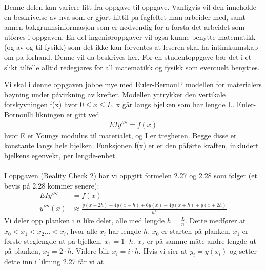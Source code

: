 Denne delen kan variere litt fra oppgave til oppgave. Vanligvis vil den inneholde en beskrivelse av hva som er gjort hittil pa fagfeltet man arbeider med, samt annen bakgrunnsinformasjon som er nødvendig for a forsta det arbeidet som utføres i oppgaven. En del ingeniøroppgaver vil ogsa kunne benytte matematikk (og av og til fysikk) som det ikke kan forventes at leseren skal ha intimkunnskap om pa forhand. Denne vil da beskrives her. For en studentoppgave bør det i et slikt tilfelle alltid redegjøres for all matematikk og fysikk som eventuelt benyttes.


Vi skal i denne oppgaven jobbe mye med Euler-Bernoulli modellen for materialers bøyning under påvirkning av krefter. Modellen yttrykker den vertikale forskyvningen f(x) hvor $0\leq x \leq L$. x går langs bjelken som har lengde L. Euler-Bornoulli likningen er gitt ved 
\begin{align}
    EIy''''=f(x)
\end{align}
hvor E er Youngs modulus til materialet, og I er tregheten. Begge disse er konstante langs hele bjelken. Funksjonen f(x) er er den påførte kraften, inkludert bjelkens egenvekt, per lengde-enhet. 
\\ \\
I oppgaven (Reality Check 2) har vi oppgitt formelen 2.27 og 2.28 som følger (et bevis på 2.28 kommer senere): 
\begin{align}
    EIy''''&=f(x) \nonumber \\
    y''''(x)& \approx \frac{y(x-2h)-4y(x-h)+6y(x)-4y(x+h)+y(x+2h)}{h^4}
\end{align}
Vi deler opp planken i $n$ like deler, alle med lengde $h=\frac{L}{n}$. Dette medfører at $x_0<x_1<x_2...<x_i$, hvor alle $x_i$ har lengde $h$. $x_0$ er starten på planken, $x_1$ er første steglengde ut på bjelken, $x_1=1\cdot h$. $x_2$ er på samme måte andre lengde ut på planken, $x_2=2\cdot h$. Videre blir $x_i=i\cdot h$. Hvis vi sier at $y_i=y(x_i)$ og setter dette inn i likning 2.27 får vi at 

